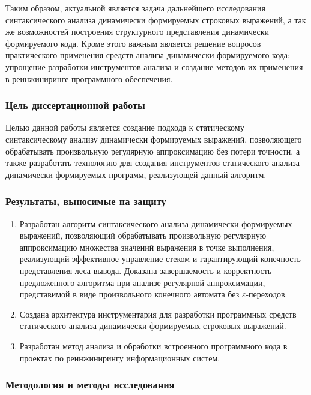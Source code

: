 Таким образом, актуальной является задача дальнейшего исследования синтаксического анализа динамически формируемых строковых выражений, а так же возможностей построения структурного представления динамически формируемого кода. Кроме этого важным является решение вопросов практического применения средств анализа динамически формируемого кода: упрощение разработки инструментов анализа и создание методов их применения в реинжиниринге программного обеспечения.

\subsubsection*{\large{Цель диссертационной работы}}

Целью данной работы является создание подхода к статическому синтаксическому анализу динамически формируемых выражений, позволяющего обрабатывать произвольную регулярную аппроксимацию без потери точности, а также разработать технологию для создания инструментов статического анализа динамически формируемых программ, реализующей данный алгоритм.

\subsubsection*{\large{Результаты, выносимые на защиту}}
\begin{enumerate}
    \item Разработан алгоритм синтаксического анализа динамически формируемых выражений, позволяющий обрабатывать произвольную регулярную аппроксимацию множества значений выражения в точке выполнения, реализующий 
    эффективное управление стеком и гарантирующий конечность представления леса вывода. Доказана завершаемость и корректность предложенного алгоритма при анализе регулярной аппроксимации, представимой в виде произвольного конечного автомата без $\varepsilon$-переходов. 
    \item Создана архитектура инструментария для разработки программных средств статического анализа динамически формируемых строковых выражений.
    \item Разработан метод анализа и обработки встроенного программного кода в проектах по реинжинирингу информационных систем. 
\end{enumerate}

\subsubsection*{\large{Методология и методы исследования}}

